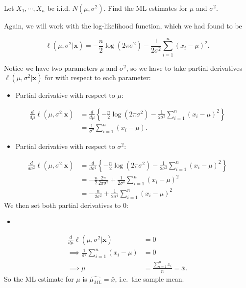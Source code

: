 \documentclass[
]{book}
\providecommand{\tightlist}{%
  \setlength{\itemsep}{0pt}\setlength{\parskip}{0pt}}
\begin{document}
Let \(X_1, \cdots, X_n\) be i.i.d. \(N(\mu, \sigma^2)\). Find the ML estimates for \(\mu\) and \(\sigma^2\).

Again, we will work with the log-likelihood function, which we had found to be

\[
\ell (\mu, \sigma^2 | \boldsymbol{x}) = -\frac{n}{2} \log (2 \pi \sigma^2) - \frac{1}{2 \sigma^2} \sum_{i=1}^n (x_i - \mu)^2.
\]

Notice we have two parameters \(\mu\) and \(\sigma^2\), so we have to take partial derivatives \(\ell (\mu, \sigma^2 | \boldsymbol{x})\) for with respect to each parameter:

\begin{itemize}
\tightlist
\item
  Partial derivative with respect to \(\mu\):
\end{itemize}

\[
\begin{split}
\frac{d}{d \mu}\ell (\mu, \sigma^2 | \boldsymbol{x}) &= \frac{d}{d \mu} \left\{ -\frac{n}{2} \log (2 \pi \sigma^2) - \frac{1}{2 \sigma^2} \sum_{i=1}^n (x_i - \mu)^2 \right \} \\
                                                     &= \frac{1}{\sigma^2} \sum_{i=1}^n (x_i - \mu).
\end{split}
\]

\begin{itemize}
\tightlist
\item
  Partial derivative with respect to \(\sigma^2\):
\end{itemize}

\[
\begin{split}
\frac{d}{d \sigma^2}\ell (\mu, \sigma^2 | \boldsymbol{x}) &= \frac{d}{d \sigma^2} \left\{ -\frac{n}{2} \log (2 \pi \sigma^2) - \frac{1}{2 \sigma^2} \sum_{i=1}^n (x_i - \mu)^2 \right \} \\
                                                     &= -\frac{n}{2}\frac{2\pi}{2 \pi \sigma^2} + \frac{1}{2 \sigma^4} \sum_{i=1}^n (x_i - \mu)^2 \\
                                                     &= -\frac{n}{2 \sigma^2} + \frac{1}{2 \sigma^4} \sum_{i=1}^n (x_i - \mu)^2
\end{split}
\]
We then set both partial derivatives to 0:

\begin{itemize}
\tightlist
\item
\end{itemize}

\[
\begin{split}
\frac{d}{d \mu}\ell (\mu, \sigma^2 | \boldsymbol{x}) &= 0 \\
\implies \frac{1}{\sigma^2} \sum_{i=1}^n (x_i - \mu) &= 0 \\
\implies \mu  &= \frac{\sum_{i=1}^n x_i}{n} = \bar{x}.
\end{split}
\]
So the ML estimate for \(\mu\) is \(\hat{\mu_{ML}} = \bar{x}\), i.e.~the sample mean.
\end{document}
